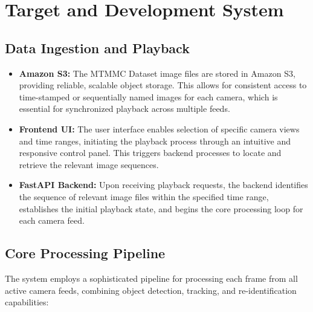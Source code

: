 \newpage

\section{Target and Development System}
\label{section:target-development-system} %

\subsection{Data Ingestion and Playback}
\label{subsection:data-ingestion-playback} %

\begin{itemize}[leftmargin=80pt]
    \item \textbf{Amazon S3:} The MTMMC Dataset image files are stored in Amazon S3, providing reliable, scalable object storage. This allows for consistent access to time-stamped or sequentially named images for each camera, which is essential for synchronized playback across multiple feeds.
    \item \textbf{Frontend UI:} The user interface enables selection of specific camera views and time ranges, initiating the playback process through an intuitive and responsive control panel. This triggers backend processes to locate and retrieve the relevant image sequences.
    \item \textbf{FastAPI Backend:} Upon receiving playback requests, the backend identifies the sequence of relevant image files within the specified time range, establishes the initial playback state, and begins the core processing loop for each camera feed.
\end{itemize}

\subsection{Core Processing Pipeline}
\label{subsection:core-processing-pipeline} %
The system employs a sophisticated pipeline for processing each frame from all active camera feeds, combining object detection, tracking, and re-identification capabilities:

